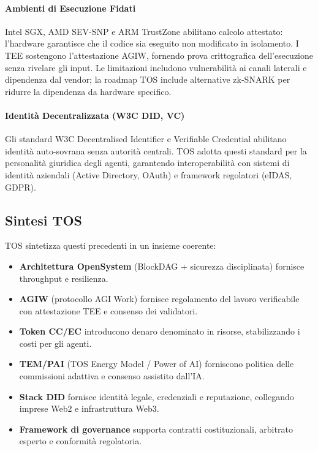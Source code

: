 \documentclass[11pt]{article}
\begin{document}
\paragraph{Ambienti di Esecuzione Fidati} Intel SGX, AMD SEV-SNP e ARM TrustZone abilitano calcolo attestato: l'hardware garantisce che il codice sia eseguito non modificato in isolamento. I TEE sostengono l'attestazione AGIW, fornendo prova crittografica dell'esecuzione senza rivelare gli input. Le limitazioni includono vulnerabilità ai canali laterali e dipendenza dal vendor; la roadmap TOS include alternative zk-SNARK per ridurre la dipendenza da hardware specifico.

\paragraph{Identità Decentralizzata (W3C DID, VC)} Gli standard W3C Decentralised Identifier e Verifiable Credential abilitano identità auto-sovrana senza autorità centrali. TOS adotta questi standard per la personalità giuridica degli agenti, garantendo interoperabilità con sistemi di identità aziendali (Active Directory, OAuth) e framework regolatori (eIDAS, GDPR).

\subsection{Sintesi TOS}
TOS sintetizza questi precedenti in un insieme coerente:
\begin{itemize}[noitemsep]
  \item \textbf{Architettura OpenSystem} (BlockDAG + sicurezza disciplinata) fornisce throughput e resilienza.
  \item \textbf{AGIW} (protocollo AGI Work) fornisce regolamento del lavoro verificabile con attestazione TEE e consenso dei validatori.
  \item \textbf{Token CC/EC} introducono denaro denominato in risorse, stabilizzando i costi per gli agenti.
  \item \textbf{TEM/PAI} (TOS Energy Model / Power of AI) forniscono politica delle commissioni adattiva e consenso assistito dall'IA.
  \item \textbf{Stack DID} fornisce identità legale, credenziali e reputazione, collegando imprese Web2 e infrastruttura Web3.
  \item \textbf{Framework di governance} supporta contratti costituzionali, arbitrato esperto e conformità regolatoria.
\end{itemize}
\end{document}
